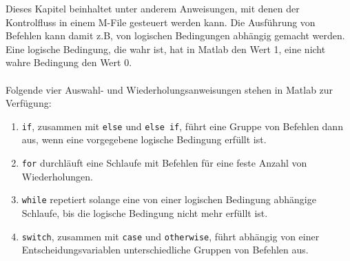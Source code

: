 Dieses Kapitel beinhaltet unter anderem Anweisungen, mit denen der Kontrolfluss in einem M-File gesteuert werden kann. Die Ausführung von Befehlen kann damit z.B, von logischen Bedingungen abhängig gemacht werden. Eine logische Bedingung, die wahr ist, hat in Matlab den Wert 1, eine nicht wahre Bedingung den Wert 0.
\\\\
Folgende vier Auswahl- und Wiederholungsanweisungen stehen in Matlab zur Verfügung:
\begin{enumerate}[$a)$]
\item \texttt{if}, zusammen mit \texttt{else} und \texttt{else if}, führt eine Gruppe von Befehlen dann aus, wenn eine vorgegebene logische Bedingung erfüllt ist.
\item \texttt{for} durchläuft eine Schlaufe mit Befehlen für eine feste Anzahl von Wiederholungen.
\item \texttt{while} repetiert solange eine von einer logischen Bedingung abhängige Schlaufe, bis die logische Bedingung nicht mehr erfüllt ist.
\item \texttt{switch}, zusammen mit \texttt{case} und \texttt{otherwise}, führt abhängig von einer Entscheidungsvariablen unterschiedliche Gruppen von Befehlen aus.  
\end{enumerate}
